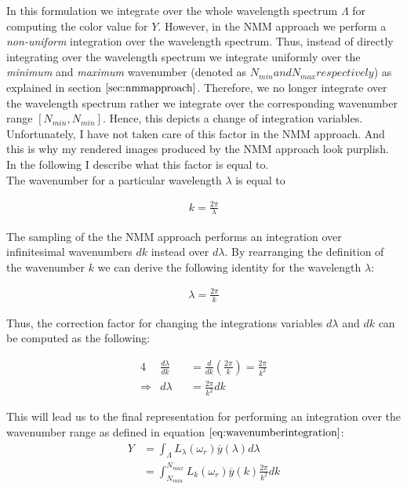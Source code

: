 In this formulation we integrate over the whole wavelength spectrum $\Lambda$ for computing the color value for $Y$. However, in the NMM approach we perform a \emph{non-uniform} integration over the wavelength spectrum. Thus, instead of directly integrating over the wavelength spectrum we integrate uniformly over the \emph{minimum} and \emph{maximum} wavenumber (denoted as $N_{min} and N_{max} respectively$) as explained in section $\ref{sec:nmmapproach}$. Therefore, we no longer integrate over the wavelength spectrum rather we integrate over the corresponding wavenumber range $[N_{min}, N_{min}]$. Hence, this depicts a change of integration variables. Unfortunately, I have not taken care of this factor in the NMM approach. And this is why my rendered images produced by the NMM approach look purplish. In the following I describe what this factor is equal to. \\

The wavenumber for a particular wavelength $\lambda$ is equal to

\begin{align}
  k = \frac{2 \pi}{\lambda} \nonumber
\end{align}

The sampling of the the NMM approach performs an integration over infinitesimal wavenumbers $dk$ instead over $d\lambda$. By rearranging the definition of the wavenumber $k$ we can derive the following identity for the wavelength $\lambda$:

\begin{align}
  \lambda = \frac{2 \pi}{k} \nonumber
\end{align}

Thus, the correction factor for changing the integrations variables $d\lambda$ and $dk$ can be computed as the following:

\begin{alignat}{4}
& \frac{d\lambda}{dk} &&= \frac{d}{dk} \left(\frac{2 \pi}{k} \right) = \frac{2 \pi}{k^2}  \nonumber \\
\Rightarrow{} & d\lambda &&= \frac{2 \pi}{k^2} dk \nonumber
\end{alignat}

This will lead us to the final representation for performing an integration over the wavenumber range as defined in equation $\ref{eq:wavenumberintegration}$:
\begin{align}
Y 
&= \int_{\Lambda}L_\lambda(\omega_r)\overline{y}(\lambda)d\lambda \nonumber \\
&= \int_{N_{min}}^{N_{max}} L_k(\omega_r)\overline{y}(k) \frac{2 \pi}{k^2} dk
\label{eq:wavenumberintegration}
\end{align}
